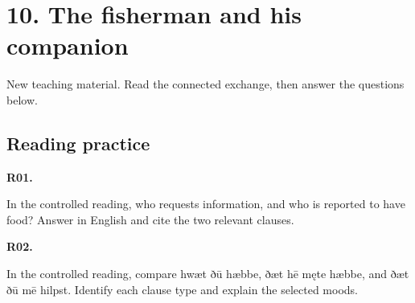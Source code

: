 \section*{10. The fisherman and his companion}

New teaching material. Read the connected exchange, then answer the questions below.

\par\begin{minipage}{\linewidth}\raggedright
{}
\end{minipage}\par

\subsection*{Reading practice}

\par\begin{minipage}{\linewidth}\raggedright
\textbf{R01.}

In the controlled reading, who requests information, and who is reported to have food? Answer in English and cite the two relevant clauses.

\end{minipage}\par\addvspace{4pt}

\par\begin{minipage}{\linewidth}\raggedright
\textbf{R02.}

In the controlled reading, compare hwæt ðū hæbbe, ðæt hē męte hæbbe, and ðæt ðū mē hilpst. Identify each clause type and explain the selected moods.

\end{minipage}\par\addvspace{4pt}

